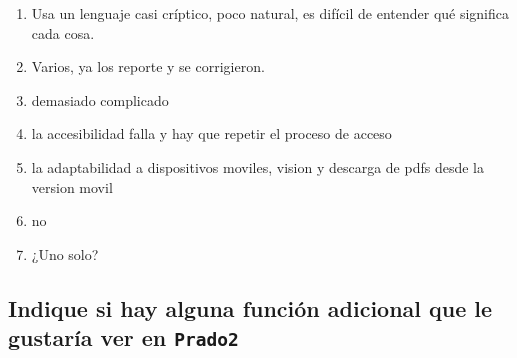\begin{enumerate}
\item Usa un lenguaje casi críptico, poco natural, es difícil de entender qué significa cada cosa.
\item Varios, ya los reporte y se corrigieron.
\item demasiado complicado
\item la accesibilidad falla y hay que repetir el proceso de acceso
\item la adaptabilidad a dispositivos moviles, vision y descarga de pdfs desde la version movil
\item no
\item ¿Uno solo?
\end{enumerate}


\subsection{Indique si hay alguna función adicional que le gustaría ver en \texttt{Prado2}}

